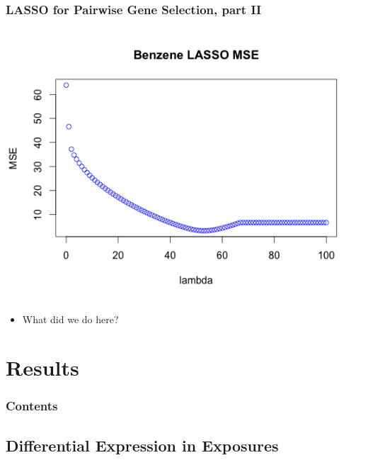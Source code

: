 \documentclass{beamer}
\begin{document}
\begin{frame}[fragile]
        \frametitle{LASSO for Pairwise Gene Selection, part II}
		\centering
                \includegraphics[scale=0.5]{../paper/figs/lasso_mse.png} 
                \begin{itemize}
			\item What did we do here?
		\end{itemize}
\end{frame}

\section{Results}

\begin{frame}
        \frametitle{Contents}
        \tableofcontents[currentsection,currentsubsection,hideothersubsections,sectionstyle=show/shaded]
\end{frame}

\subsection{Differential Expression in Exposures}
\end{document}
